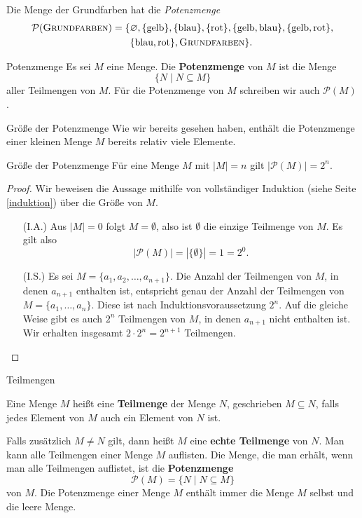 \documentclass[../../main.tex]{subfiles}
\begin{document}
\begin{example}{}
    Die Menge der Grundfarben hat die \emph{Potenzmenge}
    \begin{align*}
        \mathcal{P}(\textsc{Grundfarben})=\{&\emptyset,\{\text{gelb}\},\{\text{blau}\},\{\text{rot}\},\{\text{gelb},\text{blau}\},\{\text{gelb},\text{rot}\},\\
        &\{\text{blau},\text{rot}\},\textsc{Grundfarben}\}.
    \end{align*}
\end{example}

\begin{definition}{Potenzmenge}
    Es sei $M$ eine Menge. Die \textbf{Potenzmenge} von $M$ ist die Menge 
    \[\{N\mid N\subseteq M\}\]
    aller Teilmengen von $M$. Für die Potenzmenge von $M$ schreiben wir auch $\mathcal{P}(M)$.
\end{definition}

\begin{advanced}{Größe der Potenzmenge}
    Wie wir bereits gesehen haben, enthält die Potenzmenge einer kleinen Menge $M$ bereits relativ viele Elemente.
    \begin{theorem}{Größe der Potenzmenge}
        Für eine Menge $M$ mit $|M|=n$ gilt $|\mathcal{P}(M)|=2^n$.
    \end{theorem}
    \begin{proof}
        Wir beweisen die Aussage mithilfe von vollständiger Induktion (siehe Seite \ref{induktion}) über die Größe von $M$.
        \begin{enumerate}
            \item[(I.A.)] Aus $|M|=0$ folgt $M=\emptyset$, also ist $\emptyset$ die einzige Teilmenge von $M$. Es gilt also
                \[|\mathcal{P}(M)|=|\{\emptyset\}|=1=2^0.\]
            \item[(I.S.)] Es sei $M=\{a_1,a_2,\dots,a_{n+1}\}$. Die Anzahl der Teilmengen von $M$, in denen $a_{n+1}$ enthalten ist, entspricht genau der Anzahl der Teilmengen von $M=\{a_1,\dots,a_n\}$. Diese ist nach Induktionsvoraussetzung $2^n$. Auf die gleiche Weise gibt es auch $2^n$ Teilmengen von $M$, in denen $a_{n+1}$ nicht enthalten ist. Wir erhalten insgesamt $2\cdot 2^n=2^{n+1}$ Teilmengen.
        \end{enumerate}
    \end{proof}
\end{advanced}

\begin{nutshell}{Teilmengen}

    Eine Menge $M$ heißt eine \textbf{Teilmenge} der Menge $N$, geschrieben $M\subseteq N$, falls jedes Element von $M$ auch ein Element von $N$ ist.

    Falls zusätzlich $M\neq N$ gilt, dann heißt $M$ eine \textbf{echte Teilmenge} von $N$. Man kann alle Teilmengen einer Menge $M$ auflisten. Die Menge, die man erhält, wenn man alle Teilmengen auflistet, ist die \textbf{Potenzmenge}
    \[\mathcal{P}(M)=\{N\mid N\subseteq M\}\]
    von $M$. Die Potenzmenge einer Menge $M$ enthält immer die Menge $M$ selbst und die leere Menge.
\end{nutshell}
\end{document}
